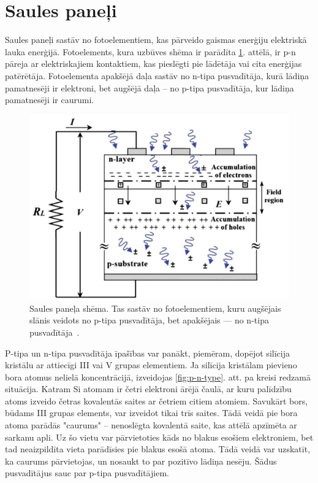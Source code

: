 \section{Saules paneļi}

Saules paneļi sastāv no fotoelementiem, kas pārveido gaismas enerģiju elektriskā lauka enerģijā. Fotoelements, kura uzbūves shēma ir parādīta \ref{fig:PV}. attēlā, ir p-n pāreja ar elektriskajiem kontaktiem, kas pieslēgti pie lādētāja vai cita enerģijas patērētāja. Fotoelementa apakšējā daļa sastāv no n-tipa pusvadītāja, kurā lādiņa pamatnesēji ir elektroni, bet augšējā daļa -- no p-tipa pusvadītāja, kur lādiņa pamatnesēji ir caurumi. 

\begin{figure}[h]
    \centering
    \includegraphics[width=0.6\linewidth]{figures/misc/PV.jpg}
    \caption{Saules paneļa shēma. Tas sastāv no fotoelementiem, kuru augšējais slānis veidots no p-tipa pusvadītāja, bet apakšējais --- no n-tipa pusvadītāja~\cite{Yahyaoui}.}
    \label{fig:PV}
\end{figure}

P-tipa un n-tipa pusvadītāja īpašības var panākt, piemēram, dopējot silīcija kristālu ar attiecīgi III vai V grupas elementiem. Ja silīcija kristālam pievieno bora atomus nelielā koncentrācijā, izveidojas \ref{fig:p-n-type}. att. pa kreisi redzamā situācija. Katram Si atomam ir četri elektroni ārējā čaulā, ar kuru palīdzību atoms izveido četras kovalentās saites ar četriem citiem atomiem. Savukārt bors, būdams III grupas elements, var izveidot tikai trīs saites. Tādā veidā pie bora atoma parādās "caurums" -- nenoslēgta kovalentā saite, kas attēlā apzīmēta ar sarkanu apli. Uz šo vietu var pārvietoties kāds no blakus esošiem elektroniem, bet tad neaizpildīta vieta parādīsies pie blakus esošā atoma. Tādā veidā var uzskatīt, ka caurums pārvietojas, un nosaukt to par pozitīvo lādiņa nesēju. Šādus pusvadītājus sauc par p-tipa pusvadītājiem. ~\cite{Yahyaoui}

